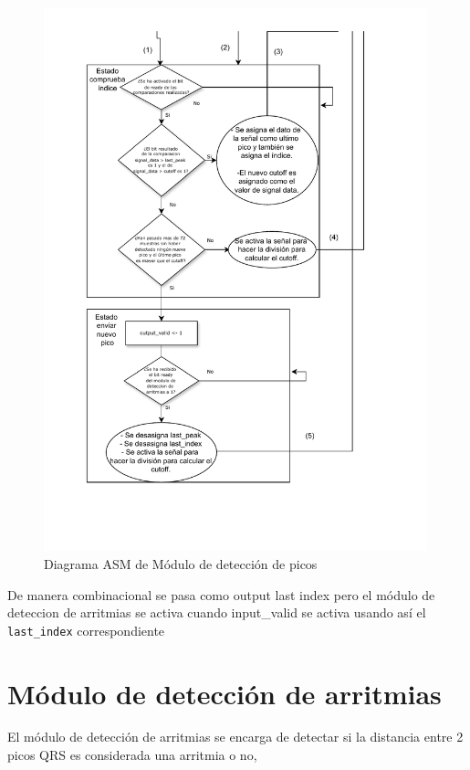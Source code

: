 \begin{figure}[h!]
    \centering
    \includegraphics[width=0.99\textwidth]{./Images/img_implementacion_hw/Diagramaasmpicos2.pdf}
    \caption{Diagrama ASM de Módulo de detección de picos}
    \label{fig:Diagramaasmpicos2}
\end{figure} 

De manera combinacional se pasa como output last index pero el módulo de deteccion de arritmias se activa cuando input\_valid
se activa usando así el \lstinline{last_index} correspondiente 


\section{Módulo de detección de arritmias}

El módulo de detección de arritmias se encarga de detectar si la distancia entre 2 picos QRS es considerada una arritmia o no,
 
